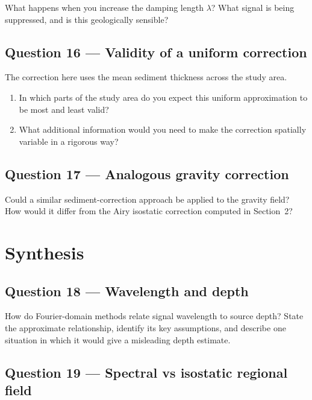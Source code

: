 \documentclass[11pt]{article}
\begin{document}
What happens when you increase the damping length $\lambda$?  What signal is
being suppressed, and is this geologically sensible?

\subsection*{Question 16 — Validity of a uniform correction}

The correction here uses the mean sediment thickness across the study area.
\begin{enumerate}[label=\alph*.]
  \item In which parts of the study area do you expect this uniform approximation
        to be most and least valid?
  \item What additional information would you need to make the correction
        spatially variable in a rigorous way?
\end{enumerate}

\subsection*{Question 17 — Analogous gravity correction}

Could a similar sediment-correction approach be applied to the gravity field?
How would it differ from the Airy isostatic correction computed in Section~2?

\section{Synthesis}

\subsection*{Question 18 — Wavelength and depth}

How do Fourier-domain methods relate signal wavelength to source depth?  State
the approximate relationship, identify its key assumptions, and describe one
situation in which it would give a misleading depth estimate.

\subsection*{Question 19 — Spectral vs isostatic regional field}
\end{document}
